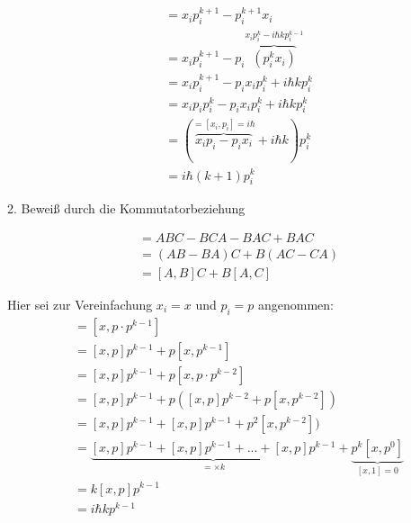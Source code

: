 \begin{align} [x_i,p_i^{k+1}] &= x_ip_i^{k+1}-p_i^{k+1}x_i \\
&= x_ip_i^{k+1}-p_i\overbrace{(p_i^kx_i)}^{x_ip_i^k-i\hbar k p_i^{k-1}}\\
&=x_ip_i^{k+1}-p_ix_ip_i^k+i\hbar k p_i^{k}\\
&=x_ip_ip_i^{k}-p_ix_ip_i^k+i\hbar k p_i^{k}\\
&=(\overbrace{x_ip_i-p_ix_i}^{=[x_i,p_i]=i\hbar}+i\hbar k )p_i^{k}\\
&=i\hbar (k+1) p_i^{k} 
\end{align}


2. Beweiß durch die Kommutatorbeziehung 

\begin{align} [A,BC]&=ABC-BCA-BAC+BAC\\
&=(AB-BA)C+B(AC-CA)\\
&=[A,B]C+B[A,C]
\end{align}


Hier sei zur Vereinfachung $x_i=x$ und $p_i=p$ angenommen:
\begin{align} [x,p^k]&=[x,p\cdot p^{k-1}]\\
&=[x,p]p^{k-1}+p[x,p^{k-1}]\\
&=[x,p]p^{k-1}+p[x,p\cdot p^{k-2}]\\
&=[x,p]p^{k-1}+p([x,p]p^{k-2}+p[x,p^{k-2}]) \\
&=[x,p]p^{k-1}+[x,p]p^{k-1}+p^2[x,p^{k-2}]) \\
&=\underbrace{[x,p]p^{k-1}+[x,p]p^{k-1}+...+[x,p]p^{k-1}}_{=\times
  k}+\underbrace{p^k[x,p^{0}]}_{[x,1]=0}\\
&=k[x,p]p^{k-1} \\
&=i\hbar kp^{k-1}
\end{align}









